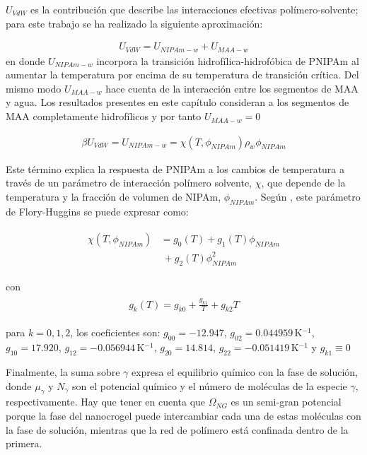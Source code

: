 	
	
	$U_{VdW}$ es la contribuci\'on que describe las interacciones efectivas pol\'imero-solvente; para este trabajo  se ha realizado la siguiente aproximaci\'on: 
	
	\begin{align}
		U_{VdW} = U_{NIPAm-w} + U_{MAA-w}
	\end{align}
	\noindent en donde $U_{NIPAm-w}$ incorpora la transici\'on hidrof\'ilica-hidrof\'obica de PNIPAm al aumentar la temperatura por encima de su temperatura de transici\'on cr\'itica. 
	Del mismo modo $U_{MAA-w}$ hace cuenta de la interacci\'on entre los segmentos de MAA y agua.
	Los resultados presentes en este cap\'itulo consideran a los segmentos de MAA completamente hidrof\'ilicos y por tanto $U_{MAA-w} = 0$
	
	\begin{align}
		\beta U_{VdW} = U_{NIPAm-w} = \chi (T, \phi_{NIPAm})\rho_w \phi_{NIPAm}
	\end{align}
	
	
	Este  t\'ermino explica la respuesta de PNIPAm a los cambios de temperatura a trav\'es de un par\'ametro de interacci\'on pol\'imero solvente, $\chi$, que depende de la temperatura y la fracci\'on de volumen de NIPAm, $\phi_{NIPAm}$.
	Seg\'un  \citet{afroze2000}, este par\'ametro de Flory-Huggins se puede expresar como:
	
	
	\begin{align}
		\begin{aligned}
			\chi (T, \phi_{NIPAm}) &=g_0(T) +g_1(T)\phi_{NIPAm} \\
			&~+ g_2(T)\phi_{NIPAm}^2
		\end{aligned}
	\end{align}
	
	\noindent con
	\begin{align}
		\begin{aligned} 
			g_k(T)=g_{k0} + \frac{g_{k1}}{T} + g_{k2}T
		\end{aligned}
	\end{align}
	
	
	\noindent para  $k=0,1,2$, los coeficientes son: $g_{00}= -12.947$, $g_{02}=0.044959\,$K$^{-1}$, $g_{10}= 17.920$, $g_{12}= -0.056944$\,K$^{-1}$, $g_{20}= 14.814$, $g_{22}= -0.051419$\,K$^{-1}$  y $g_{k1}\equiv 0$ \cite{afroze2000}
	
	
	
	
	Finalmente, la suma sobre  $\gamma$ expresa el equilibrio qu\'imico con la fase de soluci\'on, donde $\mu_\gamma$ y $N_\gamma$ son el potencial qu\'imico y el n\'umero de mol\'eculas de la especie $\gamma$, respectivamente.
	Hay que tener en cuenta que $\Omega_{NG}$ es un semi-gran potencial porque la fase del nanocrogel puede intercambiar cada una de estas mol\'eculas con la fase de soluci\'on, mientras que la red de pol\'imero est\'a confinada dentro de la primera.
	
